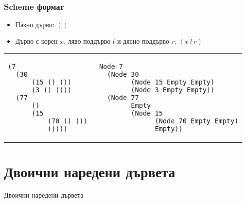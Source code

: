\documentclass{beamer}
\begin{document}
\begin{frame}[fragile]
  \frametitle{Scheme формат}


\begin{itemize}
  \item Пазно дърво: $()$
  \item Дърво с корен $x$, ляво поддърво $l$ и дясно поддърво $r$: $(x\: l \: r)$
\end{itemize}

\bigskip

\begin{tabular}{l | l}

\begin{minipage}{0.35\textwidth}
\begin{verbatim}
(7 
  (30 
      (15 () ()) 
      (3 () ())) 
  (77 
      () 
      (15 
          (70 () ()) 
          ())))  
\end{verbatim}
\end{minipage}
  
 & 

\begin{minipage}{0.65\textwidth}
\begin{verbatim}
Node 7
  (Node 30 
        (Node 15 Empty Empty)
        (Node 3 Empty Empty))
  (Node 77
        Empty
        (Node 15
              (Node 70 Empty Empty)
              Empty))
\end{verbatim}
\end{minipage}


\end{tabular}



\end{frame}

\section{Двоични наредени дървета}
\begin{frame}
  \centerline{Двоични наредени дървета}
\end{frame}
\end{document}
